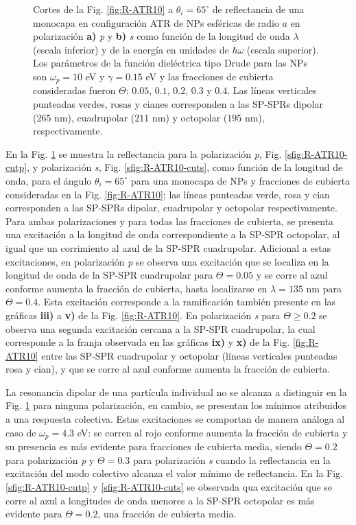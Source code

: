 \begin{figure}[b!]
	\caption{Cortes de la Fig. \ref{fig:R-ATR10} a $\theta_i = 65^\circ$ de reflectancia de una monocapa en configuración ATR de NPs esféricas de radio $a$ en polarización \textbf{a)} \emph{p} y \textbf{b)} \emph{s} como función de la longitud de onda $\lambda$ (escala inferior) y de la energía en unidades de $\hbar \omega$ (escala superior). Los parámetros de la función dieléctrica tipo Drude para las NPs son $\omega_p = 10$ eV y $\gamma = 0.15$ eV y las fracciones de cubierta consideradas fueron $\Theta$: $0. 05$, $0. 1$, $0. 2$, $0. 3$ y $0. 4$. Las líneas verticales punteadas verdes, rosas y cianes corresponden a las SP-SPRs dipolar ($265$ nm), cuadrupolar ($211$ nm) y octopolar ($195$ nm), respectivamente.  }\label{fig:R-ATR10-Cuts}
	\end{figure}	

En la Fig. \ref{fig:R-ATR10-Cuts} se muestra la reflectancia para la polarización \emph{p}, Fig. \ref{sfig:R-ATR10-cutp}, y polarización \emph{s}, Fig. \ref{sfig:R-ATR10-cuts}, como función de la longitud de onda, para el ángulo $\theta_i = 65^\circ$ para una monocapa de NPs y fracciones de cubierta consideradas en la Fig. \ref{fig:R-ATR10}; las líneas punteadas verde, rosa y cian corresponden a las SP-SPRs dipolar, cuadrupolar y octopolar respectivamente. Para ambas polarizaciones y para todas las fracciones de cubierta, se presenta una excitación a la longitud de onda correspondiente a la SP-SPR octopolar, al igual que un corrimiento al azul de la SP-SPR cuadrupolar. Adicional a estas excitaciones, en polarización \emph{p} se observa una excitación que se localiza en la longitud de onda de la SP-SPR cuadrupolar para $\Theta=0.05$ y se corre al azul conforme aumenta la fracción de cubierta, hasta localizarse en $\lambda= 135$ nm para $\Theta=0.4$. Esta excitación corresponde a la ramificación también presente en las gráficas \textbf{iii)} a \textbf{v)} de la Fig. \ref{fig:R-ATR10}. En polarización \emph{s} para $\Theta\geq 0.2$ se observa una segunda excitación cercana a la SP-SPR cuadrupolar, la cual corresponde a la franja observada en las gráficas \textbf{ix)} y \textbf{x)} de la Fig. \ref{fig:R-ATR10} entre las SP-SPR cuadrupolar y octopolar (líneas verticales punteadas rosa y cian), y que se corre al azul conforme aumenta la fracción de cubierta.

La resonancia dipolar de una partícula individual no se alcanza a distinguir en la Fig. \ref{fig:R-ATR10-Cuts} para ninguna polarización, en cambio, se presentan los mínimos atribuidos a una respuesta colectiva. Estas excitaciones se comportan de manera análoga al caso de $\omega_p = 4.3$ eV: se corren al rojo conforme aumenta la fracción de cubierta y su presencia es más evidente para fracciones de cubierta media, siendo  $\Theta=0.2$ para polarización \emph{p} y $\Theta=0.3$ para polarización \emph{s} cuando la reflectancia en la excitación del modo colectivo alcanza el valor mínimo de reflectancia. En la Fig. \ref{sfig:R-ATR10-cutp} y \ref{sfig:R-ATR10-cuts}  se observada qua excitación que se corre al azul a longitudes de onda menores a la SP-SPR octopolar es más evidente para $\Theta=0.2$, una fracción de cubierta media.

